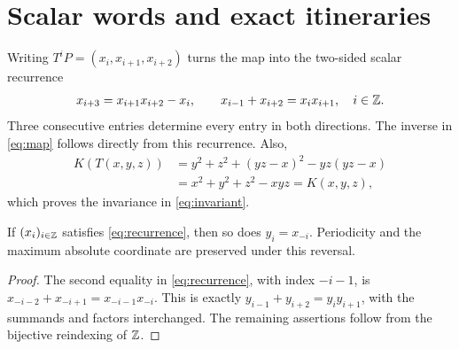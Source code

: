\section{Scalar words and exact itineraries}\label{sec:itineraries}

Writing $T^iP=(x_i,x_{i+1},x_{i+2})$ turns the map into the
two-sided scalar recurrence
\begin{equation}\label{eq:recurrence}
 x_{i+3}=x_{i+1}x_{i+2}-x_i,
 \qquad x_{i-1}+x_{i+2}=x_ix_{i+1},\quad i\in\mathbb Z.
\end{equation}
Three consecutive entries determine every entry in both directions.
The inverse in \eqref{eq:map} follows directly from this recurrence.
Also,
\begin{align*}
 K(T(x,y,z))
 &=y^2+z^2+(yz-x)^2-yz(yz-x)\\
 &=x^2+y^2+z^2-xyz=K(x,y,z),
\end{align*}
which proves the invariance in \eqref{eq:invariant}.

\begin{lemma}[Reversal]\label{lem:reversal}
If $(x_i)_{i\in\mathbb Z}$ satisfies \eqref{eq:recurrence}, then so does
$y_i=x_{-i}$. Periodicity and the maximum absolute coordinate are
preserved under this reversal.
\end{lemma}
\begin{proof}
The second equality in \eqref{eq:recurrence}, with index $-i-1$,
is
$x_{-i-2}+x_{-i+1}=x_{-i-1}x_{-i}$.
This is exactly $y_{i-1}+y_{i+2}=y_iy_{i+1}$, with the summands
and factors interchanged. The remaining assertions follow from the
bijective reindexing of $\mathbb Z$.
\end{proof}

